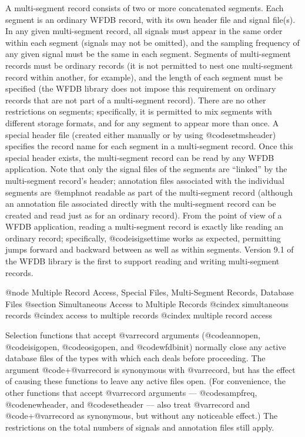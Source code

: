 {{{{{{{{{{A multi-segment record consists of two or more concatenated segments.
Each segment is an ordinary WFDB record, with its own header file and
signal file(s).  In any given multi-segment record, all signals must
appear in the same order within each segment (signals may not be
omitted), and the sampling frequency of any given signal must be the
same in each segment.  Segments of multi-segment records must be
ordinary records (it is not permitted to nest one multi-segment record
within another, for example), and the length of each segment must be
specified (the WFDB library does not impose this requirement on ordinary
records that are not part of a multi-segment record).  There are no
other restrictions on segments; specifically, it is permitted to mix
segments with different storage formats, and for any segment to appear
more than once.  A special header file (created either manually or by
using @code{setmsheader}) specifies the record name for each segment in
a multi-segment record.  Once this special header exists, the
multi-segment record can be read by any WFDB application.  Note that only
the signal files of the segments are ``linked'' by the multi-segment
record's header; annotation files associated with the individual
segments are @emph{not} readable as part of the multi-segment record
(although an annotation file associated directly with the multi-segment
record can be created and read just as for an ordinary record).  From
the point of view of a WFDB application, reading a multi-segment record is
exactly like reading an ordinary record; specifically,
@code{isigsettime} works as expected, permitting jumps forward and
backward between as well as within segments.  Version 9.1 of the WFDB
library is the first to support reading and writing multi-segment
records.

@node     Multiple Record Access, Special Files, Multi-Segment Records, Database Files
@section Simultaneous Access to Multiple Records
@cindex simultaneous records
@cindex access to multiple records
@cindex multiple record access

Selection functions that accept @var{record} arguments (@code{annopen},
@code{isigopen}, @code{osigopen}, and @code{wfdbinit}) normally close any
active database files of the types with which each deals before
proceeding.  The argument @code{+}@var{record} is synonymous with
@var{record}, but has the effect of causing these functions to leave any
active files open.  (For convenience, the other functions that accept
@var{record} arguments --- @code{sampfreq}, @code{newheader}, and
@code{setheader} --- also treat @var{record} and @code{+}@var{record} as
synonymous, but without any noticeable effect.)  The restrictions on the
total numbers of signals and annotation files still apply.

}}}}}}}}}}
